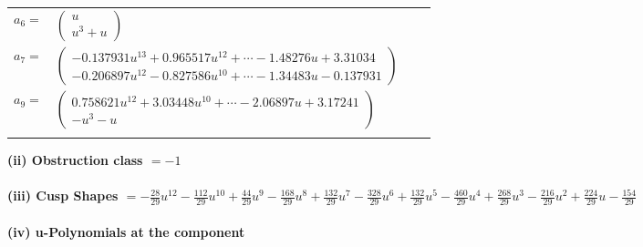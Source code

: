 \documentclass[1p]{elsarticle_modified}
\theoremstyle{definition}
\begin{document}
\begin{tabular}{m{7pt} m{180pt} m{7pt} m{180pt} }
\flushright $a_{6}=$&$\begin{pmatrix}u\\u^3+u\end{pmatrix}$ \\
\flushright $a_{7}=$&$\begin{pmatrix}-0.137931 u^{13}+0.965517 u^{12}+\cdots-1.48276 u+3.31034\\-0.206897 u^{12}-0.827586 u^{10}+\cdots-1.34483 u-0.137931\end{pmatrix}$ \\
\flushright $a_{9}=$&$\begin{pmatrix}0.758621 u^{12}+3.03448 u^{10}+\cdots-2.06897 u+3.17241\\- u^3- u\end{pmatrix}$\\&\end{tabular}
\flushleft \textbf{(ii) Obstruction class $= -1$}\\~\\
\flushleft \textbf{(iii) Cusp Shapes $= -\frac{28}{29} u^{12}-\frac{112}{29} u^{10}+\frac{44}{29} u^9-\frac{168}{29} u^8+\frac{132}{29} u^7-\frac{328}{29} u^6+\frac{132}{29} u^5-\frac{460}{29} u^4+\frac{268}{29} u^3-\frac{216}{29} u^2+\frac{224}{29} u-\frac{154}{29}$}\\~\\
\newpage\renewcommand{\arraystretch}{1}
\flushleft \textbf{(iv) u-Polynomials at the component}\newline \\
\end{document}
